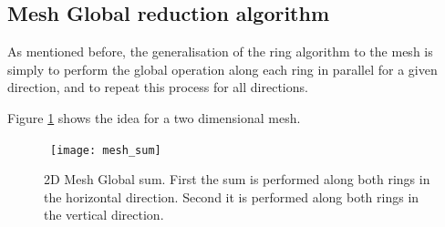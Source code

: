 \subsection{Mesh Global reduction algorithm}
As mentioned before, the generalisation of the ring algorithm to the 
mesh is simply to perform the global operation along each ring in
parallel for a given direction, and to repeat this process for 
all directions. 

Figure \ref{f:2DMeshsum} shows the idea for a two dimensional mesh.
\begin{figure}
\begin{center}
\leavevmode
\hbox{%
\texttt{[image: mesh\_sum]}
}
\end{center}
\caption{2D Mesh Global sum. First the sum is performed along both 
rings in the horizontal direction. Second it is performed along 
both rings in the vertical direction.}
\label{f:2DMeshsum}
\end{figure}

